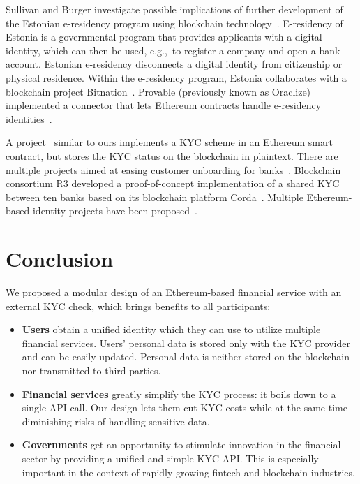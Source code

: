 Sullivan and Burger investigate possible implications of further development of the Estonian e-residency program using blockchain technology~\cite{Sullivan2017}.
E-residency of Estonia is a governmental program that provides applicants with a digital identity, which can then be used, e.g.,~to register a company and open a bank account.
Estonian e-residency disconnects a digital identity from citizenship or physical residence.
Within the e-residency program, Estonia collaborates with a blockchain project Bitnation~\cite{Bitnation15, Estonia15}.
Provable (previously known as Oraclize) implemented a connector that lets Ethereum contracts handle e-residency identities~\cite{Provable}.

A project~\cite{Ohtamaa2016} similar to ours implements a KYC scheme in an Ethereum smart contract, but stores the KYC status on the blockchain in plaintext.
There are multiple projects aimed at easing customer onboarding for banks~\cite{CambridgeBlockchain, KycChain, SnapSwap, Tradle}.
Blockchain consortium R3 developed a proof-of-concept implementation of a shared KYC between ten banks based on its blockchain platform Corda~\cite{Allison2016}.
Multiple Ethereum-based identity projects have been proposed~\cite{Mesropyan2017, Sovrin, Uport}.



\section{Conclusion}

We proposed a modular design of an Ethereum-based financial service with an external KYC check, which brings benefits to all participants:

\begin{itemize}
	\item \textbf{Users} obtain a unified identity which they can use to utilize multiple financial services.
	Users' personal data is stored only with the KYC provider and can be easily updated.
	Personal data is neither stored on the blockchain nor transmitted to third parties.
	\item \textbf{Financial services} greatly simplify the KYC process: it boils down to a single API call.
	Our design lets them cut KYC costs while at the same time diminishing risks of handling sensitive data.
	\item \textbf{Governments} get an opportunity to stimulate innovation in the financial sector by providing a unified and simple KYC API\@.
	This is especially important in the context of rapidly growing fintech and blockchain industries.
\end{itemize}

